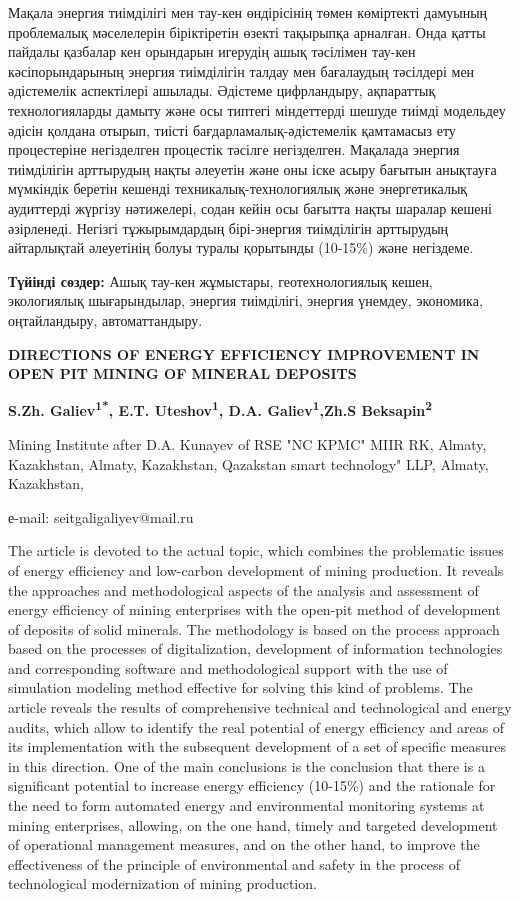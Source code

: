 Мақала энергия тиімділігі мен тау-кен өндірісінің төмен көміртекті
дамуының проблемалық мәселелерін біріктіретін өзекті тақырыпқа арналған.
Онда қатты пайдалы қазбалар кен орындарын игерудің ашық тәсілімен
тау-кен кәсіпорындарының энергия тиімділігін талдау мен бағалаудың
тәсілдері мен әдістемелік аспектілері ашылады. Әдістеме цифрландыру,
ақпараттық технологияларды дамыту және осы типтегі міндеттерді шешуде
тиімді модельдеу әдісін қолдана отырып, тиісті бағдарламалық-әдістемелік
қамтамасыз ету процестеріне негізделген процестік тәсілге негізделген.
Мақалада энергия тиімділігін арттырудың нақты әлеуетін және оны іске
асыру бағытын анықтауға мүмкіндік беретін кешенді
техникалық-технологиялық және энергетикалық аудиттерді жүргізу
нәтижелері, содан кейін осы бағытта нақты шаралар кешені әзірленеді.
Негізгі тұжырымдардың бірі-энергия тиімділігін арттырудың айтарлықтай
әлеуетінің болуы туралы қорытынды (10-15\%) және негіздеме.

{\bfseries Түйінді сөздер:} Ашық тау-кен жұмыстары, геотехнологиялық кешен,
экологиялық шығарындылар, энергия тиімділігі, энергия үнемдеу,
экономика, оңтайландыру, автоматтандыру.

\begin{center}
{\large\bfseries DIRECTIONS OF ENERGY EFFICIENCY IMPROVEMENT IN OPEN PIT MINING
OF MINERAL DEPOSITS}

{\bfseries S.Zh. Galiev\textsuperscript{1*}, E.T.
Uteshov\textsuperscript{1}, D.A. Galiev\textsuperscript{1},Zh.S
Beksapin\textsuperscript{2}}

Mining Institute after D.A. Kunayev of RSE "NC KPMC" MIIR RK, Almaty,
Kazakhstan, Almaty, Kazakhstan, Qazakstan smart technology" LLP, Almaty,
Kazakhstan,

е-mail: seitgaligaliyev@mail.ru
\end{center}

The article is devoted to the actual topic, which combines the
problematic issues of energy efficiency and low-carbon development of
mining production. It reveals the approaches and methodological aspects
of the analysis and assessment of energy efficiency of mining
enterprises with the open-pit method of development of deposits of solid
minerals. The methodology is based on the process approach based on the
processes of digitalization, development of information technologies and
corresponding software and methodological support with the use of
simulation modeling method effective for solving this kind of problems.
The article reveals the results of comprehensive technical and
technological and energy audits, which allow to identify the real
potential of energy efficiency and areas of its implementation with the
subsequent development of a set of specific measures in this direction.
One of the main conclusions is the conclusion that there is a
significant potential to increase energy efficiency (10-15\%) and the
rationale for the need to form automated energy and environmental
monitoring systems at mining enterprises, allowing, on the one hand,
timely and targeted development of operational management measures, and
on the other hand, to improve the effectiveness of the principle of
environmental and safety in the process of technological modernization
of mining production.

